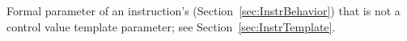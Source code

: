 
Formal parameter of an instruction's  (Section~\ref{sec:InstrBehavior}) that is not a control value template parameter; see Section~\ref{sec:InstrTemplate}.

